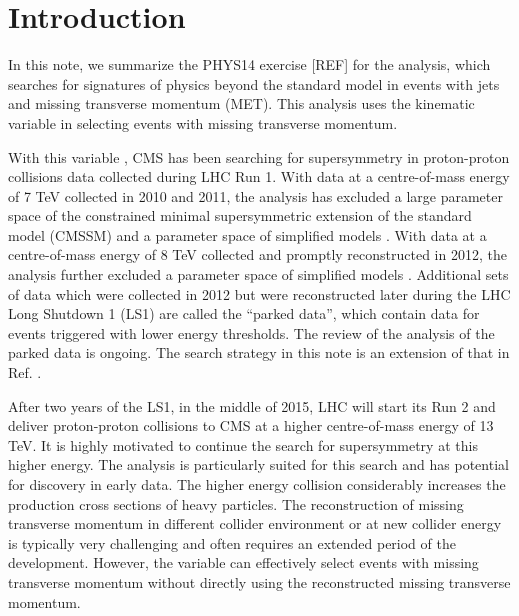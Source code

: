 \section{Introduction}
\label{sec:intro}


In this note, we summarize the PHYS14 exercise [REF] for the \alphat
analysis, which searches for signatures of physics beyond the standard
model in events with jets and missing transverse momentum (MET). This
analysis uses the kinematic variable \alphat in selecting events with
missing transverse momentum.

With this variable \alphat, CMS has been searching for supersymmetry in
proton-proton collisions data collected during LHC Run 1. With data at a
centre-of-mass energy of 7 TeV collected in 2010 and 2011, the \alphat
analysis has excluded a large parameter space of the constrained minimal
supersymmetric extension of the standard model (CMSSM)
\cite{Khachatryan:2011tk, Chatrchyan:2011zy, Chatrchyan:2012wa} and a
parameter space of simplified models \cite{Chatrchyan:2012wa}. With data
at a centre-of-mass energy of 8 TeV collected and promptly reconstructed
in 2012, the \alphat analysis further excluded a parameter space of
simplified models \cite{Chatrchyan:2013lya}. Additional sets of data
which were collected in 2012 but were reconstructed later during the LHC
Long Shutdown 1 (LS1) are called the ``parked data'', which contain data
for events triggered with lower energy thresholds. The review of the
\alphat analysis of the parked data \cite{CMS_AN_2013-366} is ongoing.
The search strategy in this note is an extension of that in Ref.
\cite{CMS_AN_2013-366}.

After two years of the LS1, in the middle of 2015, LHC will start its
Run 2 and deliver proton-proton collisions to CMS at a higher
centre-of-mass energy of 13 TeV. It is highly motivated to continue the
search for supersymmetry at this higher energy. The \alphat analysis is
particularly suited for this search and has potential for discovery in
early data. The higher energy collision considerably increases the
production cross sections of heavy particles. The reconstruction of
missing transverse momentum in different collider environment or at new
collider energy is typically very challenging and often requires an
extended period of the development. However, the variable \alphat can
effectively select events with missing transverse momentum without
directly using the reconstructed missing transverse momentum.

